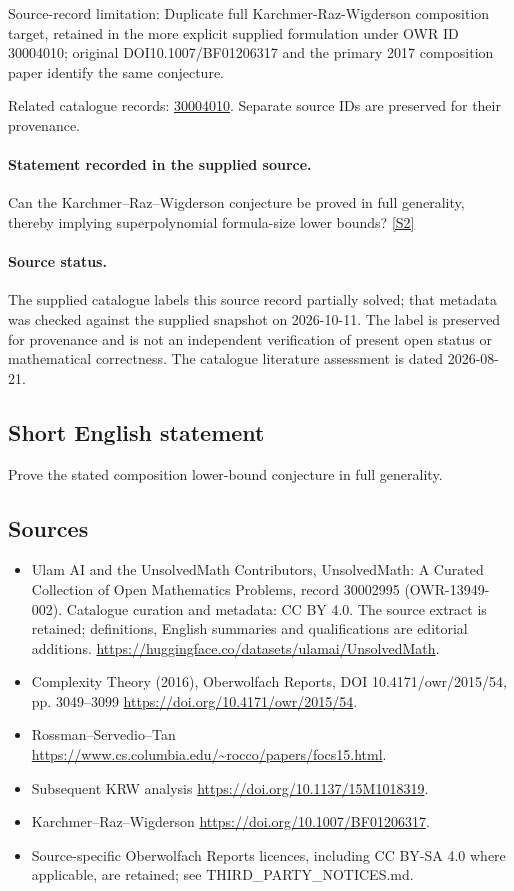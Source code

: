 \documentclass[11pt]{article}
\begin{document}
Source-record limitation: Duplicate full Karchmer-Raz-Wigderson composition target, retained in the more explicit supplied formulation under OWR ID 30004010; original DOI10.1007/BF01206317 and the primary 2017 composition paper identify the same conjecture.

Related catalogue records: \href{https://mehmetmars7.github.io/Erdosproblems-llm-hunter/problem.html?type=open_problems&id=30004010}{30004010}. Separate source IDs are preserved for their provenance.
\paragraph{Statement recorded in the supplied source.}
Can the Karchmer–Raz–Wigderson conjecture be proved in full generality, thereby implying superpolynomial formula-size lower bounds? \href{https://doi.org/10.4171/owr/2015/54}{[S2]}
\paragraph{Source status.}
The supplied catalogue labels this source record partially solved; that metadata was checked against the supplied snapshot on 2026-10-11. The label is preserved for provenance and is not an independent verification of present open status or mathematical correctness. The catalogue literature assessment is dated 2026-08-21.
\subsection{Short English statement}
Prove the stated composition lower-bound conjecture in full generality.
\subsection{Sources}
\begin{itemize}
\item[S1] Ulam AI and the UnsolvedMath Contributors, UnsolvedMath: A Curated Collection of Open Mathematics Problems, record 30002995 (OWR-13949-002). Catalogue curation and metadata: CC BY 4.0. The source extract is retained; definitions, English summaries and qualifications are editorial additions.
\url{https://huggingface.co/datasets/ulamai/UnsolvedMath}.
\item[S2] Complexity Theory (2016), Oberwolfach Reports, DOI 10.4171/owr/2015/54, pp. 3049--3099
\url{https://doi.org/10.4171/owr/2015/54}.
\item[S3] Rossman--Servedio--Tan
\url{https://www.cs.columbia.edu/~rocco/papers/focs15.html}.
\item[S4] Subsequent KRW analysis
\url{https://doi.org/10.1137/15M1018319}.
\item[S5] Karchmer--Raz--Wigderson
\url{https://doi.org/10.1007/BF01206317}.
\item Source-specific Oberwolfach Reports licences, including CC BY-SA 4.0 where applicable, are retained; see THIRD\_PARTY\_NOTICES.md.
\end{itemize}
\end{document}
